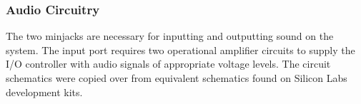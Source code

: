 
\subsubsection{Audio Circuitry}

The two minjacks are necessary for inputting and outputting sound on the system. The input port requires two operational amplifier circuits to supply the I/O controller with audio signals of appropriate voltage levels. The circuit schematics were copied over from equivalent schematics found on Silicon Labs development kits.